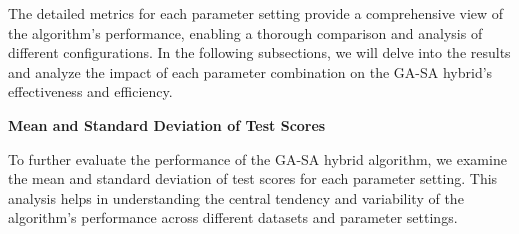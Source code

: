 \documentclass[
]{article}
\begin{document}
    The detailed metrics for each parameter setting provide a comprehensive view of the algorithm's performance, enabling a thorough comparison and analysis of different configurations. In the following subsections, we will delve into the results and analyze the impact of each parameter combination on the GA-SA hybrid's effectiveness and efficiency.

    \textbf{Mean and Standard Deviation of Test Scores}

    To further evaluate the performance of the GA-SA hybrid algorithm, we examine the mean and standard deviation of test scores for each parameter setting. This analysis helps in understanding the central tendency and variability of the algorithm's performance across different datasets and parameter settings.

    \begin{table}[H]
        \centering
\end{table}
\end{document}
